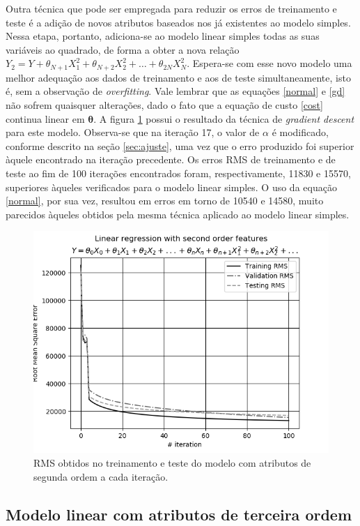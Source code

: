 \documentclass[10pt,twocolumn,letterpaper]{article}
\begin{document}
Outra técnica que pode ser empregada para reduzir os erros de treinamento e teste é a adição de novos atributos baseados nos já existentes ao modelo simples. Nessa etapa, portanto, adiciona-se ao modelo linear simples todas as suas variáveis ao quadrado, de forma a obter a nova relação \(Y_2 = Y + \theta_{N+1}X_1^2 + \theta_{N+2}X_2^2 + \ldots + \theta_{2N}X_N^2\). Espera-se com esse novo modelo uma melhor adequação aos dados de treinamento e aos de teste simultaneamente, isto é, sem a observação de \textit{overfitting}.  Vale lembrar que as equações \ref{normal} e \ref{gd} não sofrem quaisquer alterações, dado o fato que a equação de custo \ref{cost} continua linear em \(\bm{\theta}\). A figura \ref{fig:gd-second} possui o resultado da técnica de \textit{gradient descent} para este modelo. Observa-se que na iteração 17, o valor de \(\alpha\) é modificado, conforme descrito na seção \ref{sec:ajuste}, uma vez que o erro produzido foi superior àquele encontrado na iteração precedente. Os erros RMS de treinamento e de teste ao fim de 100 iterações encontrados foram, respectivamente, 11830 e 15570, superiores àqueles verificados para o modelo linear simples. O uso da equação \ref{normal}, por sua vez, resultou em erros em torno de 10540 e 14580, muito parecidos àqueles obtidos pela mesma técnica aplicado ao modelo linear simples.

\begin{figure}
    \centering
    \includegraphics[width=0.9\columnwidth]{img/lr-second-gd.png}
    \caption{RMS obtidos no treinamento e teste do modelo com atributos de segunda ordem a cada iteração.}
    \label{fig:gd-second}
\end{figure}

\subsection{Modelo linear com atributos de terceira ordem}
\end{document}
